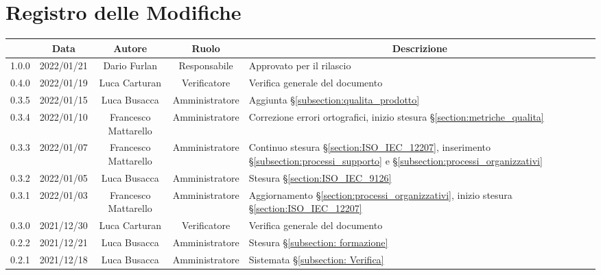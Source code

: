 \thispagestyle{empty}
\section*{Registro delle Modifiche}

\begin{center}
	\renewcommand{\arraystretch}{1.8}
	\begin{longtable}[c]{c | c | c | c | p{5cm}}
		\rowcolor[HTML]{125E28}
		\multicolumn{1}{c}{\color[HTML]{FFFFFF} \textbf{Versione}} &
		\multicolumn{1}{c}{\color[HTML]{FFFFFF} \textbf{Data}}     &
		\multicolumn{1}{c}{\color[HTML]{FFFFFF} \textbf{Autore}}   &
		\multicolumn{1}{c}{\color[HTML]{FFFFFF} \textbf{Ruolo}}    &
		\multicolumn{1}{c}{\color[HTML]{FFFFFF} \textbf{Descrizione}}                                                                                                                                                                                               \\
		\endhead
		1.0.0 & 2022/01/21 & Dario Furlan & Responsabile & Approvato per il rilascio \\
		0.4.0 & 2022/01/19 & Luca Carturan & Verificatore & Verifica generale del documento \\
		0.3.5 & 2022/01/15 & Luca Busacca & Amministratore & Aggiunta §\ref{subsection:qualita_prodotto} \\
		0.3.4 & 2022/01/10 & Francesco Mattarello & Amministratore & Correzione errori ortografici, inizio stesura §\ref{section:metriche_qualita} \\
		0.3.3 & 2022/01/07 & Francesco Mattarello & Amministratore & Continuo stesura §\ref{section:ISO_IEC_12207}, inserimento §\ref{subsection:processi_supporto} e §\ref{subsection:processi_organizzativi} \\
		0.3.2 & 2022/01/05 & Luca Busacca         & Amministratore & Stesura §\ref{section:ISO_IEC_9126} \\
		0.3.1 & 2022/01/03 & Francesco Mattarello & Amministratore & Aggiornamento §\ref{section:processi_organizzativi}, inizio stesura §\ref{section:ISO_IEC_12207} \\
		0.3.0 & 2021/12/30 & Luca Carturan        & Verificatore   & Verifica generale del documento \\
		0.2.2 & 2021/12/21 & Luca Busacca         & Amministratore & Stesura §\ref{subsection: formazione} \\
		0.2.1 & 2021/12/18 & Luca Busacca         & Amministratore & Sistemata §\ref{subsection: Verifica} \\

\end{longtable}
\end{center}

